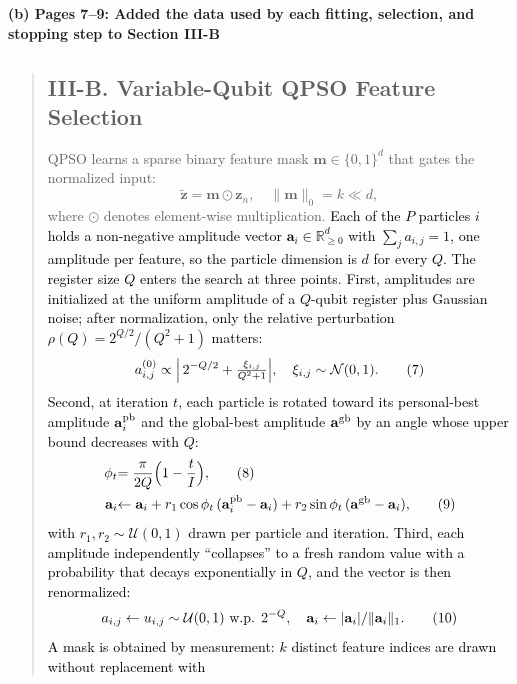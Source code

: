 \documentclass[11pt]{article}
\newenvironment{excerpt}{\begin{quote}\sloppy}{\end{quote}}
\newcommand{\mshead}[2]{\subsection*{\textbf{#1. #2}}}
\newcommand{\loc}[1]{\par\medskip\noindent\textbf{#1}\par}
\begin{document}
\loc{(b) Pages 7--9: Added the data used by each fitting, selection, and stopping step to Section III-B}
\begin{excerpt}
\mshead{III-B}{Variable-Qubit QPSO Feature Selection}


QPSO learns a sparse binary feature mask
$\mathbf{m}\in\{0,1\}^d$ that gates the normalized input:
\begin{equation}
\tilde{\mathbf{z}} = \mathbf{m}\odot\mathbf{z}_n,\quad
\|\mathbf{m}\|_0 = k \ll d,
\tag{6}
\end{equation}
where $\odot$ denotes element-wise multiplication.
\textcolor{black}{Each of the $P$ particles $i$ holds a
non-negative amplitude vector $\mathbf{a}_i\in\mathbb{R}_{\ge 0}^{d}$
with $\sum_j a_{i,j}=1$, one amplitude per feature, so the particle
dimension is $d$ for every $Q$. The register size $Q$ enters the
search at three points. First, amplitudes are initialized at the
uniform amplitude of a $Q$-qubit register plus Gaussian noise; after
normalization, only the relative perturbation
$\rho(Q)=2^{Q/2}/(Q^{2}+1)$ matters:}
\begin{equation}
\textcolor{black}{a_{i,j}^{(0)} \propto \Bigl|\,2^{-Q/2} +
\tfrac{\xi_{i,j}}{Q^{2}+1}\Bigr|,\quad
\xi_{i,j}\sim\mathcal{N}(0,1).}
\tag{7}
\end{equation}
\textcolor{black}{Second, at iteration $t$, each particle is
rotated toward its personal-best amplitude $\mathbf{a}_i^{\rm pb}$
and the global-best amplitude $\mathbf{a}^{\rm gb}$ by an angle whose
upper bound decreases with $Q$:}
\begin{align}
\textcolor{black}{\phi_t} &\textcolor{black}{= \frac{\pi}{2Q}\Bigl(1-\frac{t}{I}\Bigr),}
\tag{8}\\
\textcolor{black}{\mathbf{a}_i} &\textcolor{black}{\leftarrow \mathbf{a}_i
+ r_1\cos\phi_t\,(\mathbf{a}_i^{\rm pb}-\mathbf{a}_i)
+ r_2\sin\phi_t\,(\mathbf{a}^{\rm gb}-\mathbf{a}_i),}
\tag{9}
\end{align}
\textcolor{black}{with $r_1,r_2\sim\mathcal{U}(0,1)$ drawn per
particle and iteration. Third, each amplitude independently
``collapses'' to a fresh random value with a probability that decays
exponentially in $Q$, and the vector is then renormalized:}
\begin{equation}
\textcolor{black}{a_{i,j} \leftarrow u_{i,j}\sim\mathcal{U}(0,1)
\ \text{w.p. } 2^{-Q},\quad
\mathbf{a}_i \leftarrow |\mathbf{a}_i| / \|\mathbf{a}_i\|_1 .}
\tag{10}
\end{equation}
\textcolor{black}{A mask is obtained by measurement: $k$
distinct feature indices are drawn without replacement with
}
\end{excerpt}
\end{document}
